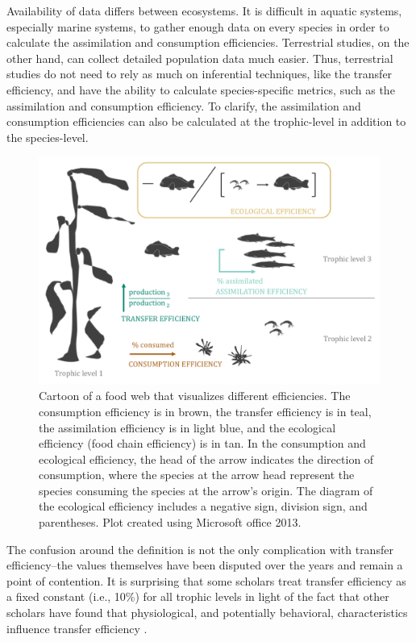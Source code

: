 \documentclass[oneside,12pt,final]{sty/ucthesis-CA2012}
\let\cite\citep                             %
\begin{document}
\begin{mainmatter}
\vspace{5mm}

Availability of data differs between ecosystems. It is difficult in aquatic systems, especially marine systems, to gather enough data on every species in order to calculate the assimilation and consumption efficiencies. Terrestrial studies, on the other hand, can collect detailed population data much easier. Thus, terrestrial studies do not need to rely as much on inferential techniques, like the transfer efficiency, and have the ability to calculate species-specific metrics, such as the assimilation and consumption efficiency. To clarify, the assimilation and consumption efficiencies can also be calculated at the trophic-level in addition to the species-level.

\begin{figure}[H]
     \centering
       \includegraphics[width=\textwidth]{fig/foodwebimage}
    \caption{Cartoon of a food web that visualizes different efficiencies. The consumption efficiency is in brown, the transfer efficiency is in teal, the assimilation efficiency is in light blue, and the ecological efficiency (food chain efficiency) is in tan. In the consumption and ecological efficiency, the head of the arrow indicates the direction of consumption, where the species at the arrow head represent the species consuming the species at the arrow's origin. The diagram of the ecological efficiency includes a negative sign, division sign, and parentheses. Plot created using Microsoft office 2013.}
    \label{foodweb}
\end{figure}

The confusion around the definition is not the only complication with transfer efficiency--the values themselves have been disputed over the years and remain a point of contention. It is surprising that some scholars treat transfer efficiency as a fixed constant (i.e., 10\%) for all trophic levels in light of the fact that other scholars have found that physiological, and potentially behavioral, characteristics influence transfer efficiency \cite{may1983ecology, pauly1995primary, ware2000aquatic, cury2005trophodynamic, libralato2008novel, chassot2010global, trebilco2013ecosystem, watson2014primary}.


\end{mainmatter}
\end{document}
